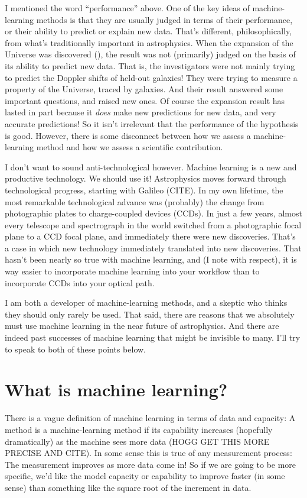 \documentclass[modern]{aastex631}
\begin{document}
I mentioned the word ``performance'' above.
One of the key ideas of machine-learning methods is that they are usually judged in terms of their performance, or their ability to predict or explain new data.
That's different, philosophically, from what's traditionally important in astrophysics.
When the expansion of the Universe was discovered (\citealt{expansion}), the result was not (primarily) judged on the basis of its ability to predict new data.
That is, the investigators were not mainly trying to predict the Doppler shifts of held-out galaxies!
They were trying to measure a property of the Universe, traced by galaxies.
And their result answered some important questions, and raised new ones.
Of course the expansion result has lasted in part because it \emph{does} make new predictions for new data, and very accurate predictions!
So it isn't irrelevant that the performance of the hypothesis is good.
However, there is some disconnect between how we assess a machine-learning method and how we assess a scientific contribution.

I don't want to sound anti-technological however.
Machine learning is a new and productive technology.
We should use it!
Astrophysics moves forward through technological progress, starting with Galileo (CITE).
In my own lifetime, the most remarkable technological advance was (probably) the change from photographic plates to charge-coupled devices (CCDs).
In just a few years, almost every telescope and spectrograph in the world switched from a photographic focal plane to a CCD focal plane, and immediately there were new discoveries.
That's a case in which new technology immediately translated into new discoveries.
That hasn't been nearly so true with machine learning, and (I note with respect), it is way easier to incorporate machine learning into your workflow than to incorporate CCDs into your optical path.

I am both a developer of machine-learning methods, and a skeptic who thinks they should only rarely be used.
That said, there are reasons that we absolutely must use machine learning in the near future of astrophysics.
And there are indeed past successes of machine learning that might be invisible to many.
I'll try to speak to both of these points below.

\section{What is machine learning?}\label{sec:what}

There is a vague definition of machine learning in terms of data and capacity:
A method is a machine-learning method if its capability increases (hopefully dramatically) as the machine sees more data (HOGG GET THIS MORE PRECISE AND CITE).
In some sense this is true of any measurement process:
The measurement improves as more data come in!
So if we are going to be more specific, we'd like the model capacity or capability to improve faster (in some sense) than something like the square root of the increment in data.
\end{document}
